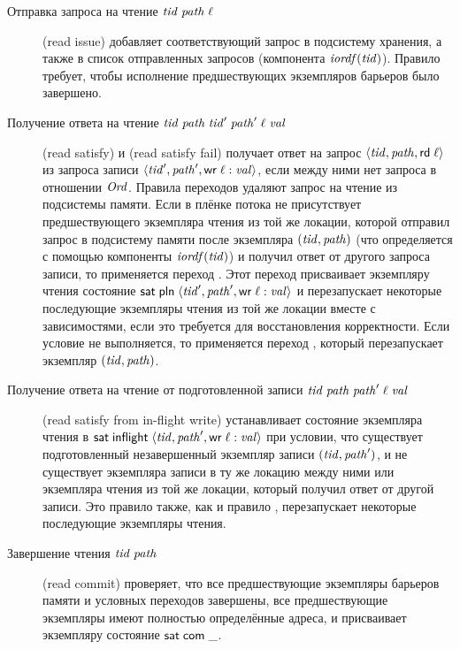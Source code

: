 \begin{description}
\item[Отправка запроса на чтение $\mathit{tid} \; \mathit{path} \; \ell$] (read issue)
  добавляет соответствующий запрос в подсистему хранения, а также в список отправленных
  запросов (компонента $\mathit{iordf}(\mathit{tid})$).
  Правило требует, чтобы исполнение предшествующих экземпляров барьеров было завершено.

\item[Получение ответа на чтение $\mathit{tid} \; \mathit{path} \; \mathit{tid}' \; \mathit{path}' \; \ell \; \mathit{val}$]
  (read satisfy) и 
  (read satisfy fail)
получает ответ на запрос $\langle \mathit{tid}, \mathit{path}, {\sf rd} \; \ell \rangle$ из запроса записи
$\langle \mathit{tid}', \mathit{path}', {\sf wr} \; \ell:\mathit{val} \rangle$, если между ними нет запроса в отношении $\mathit{Ord}$.
Правила переходов удаляют запрос на чтение из подсистемы памяти.
Если в плёнке потока не присутствует предшествующего экземпляра чтения из той же локации,
которой отправил запрос в подсистему памяти после экземпляра $(\mathit{tid}, \mathit{path})$
(что определяется с помощью компоненты $\mathit{iordf}(\mathit{tid})$)
и получил ответ от другого запроса записи, то применяется переход
. Этот переход присваивает экземпляру чтения
состояние $\mathsf{sat} \; \mathsf{pln} \; \langle \mathit{tid}', \mathit{path}', {\sf wr} \; \ell:\mathit{val} \rangle$
и перезапускает некоторые последующие экземпляры чтения из той же локации вместе с зависимостями,
если это требуется для восстановления корректности.
Если условие не выполняется, то применяется переход ,
который перезапускает экземпляр $(\mathit{tid}, \mathit{path})$.

\item[Получение ответа на чтение от подготовленной записи
  $\mathit{tid} \; \mathit{path} \; \mathit{path}' \; \ell \; \mathit{val}$]
  (read satisfy from in-flight write)
устанавливает состояние экземпляра чтения в
$\mathsf{sat} \; \mathsf{inflight} \; \langle \mathit{tid}, \mathit{path}', {\sf wr} \; \ell:\mathit{val} \rangle$
при условии, что существует подготовленный незавершенный экземпляр записи $(\mathit{tid}, \mathit{path}')$,
и не существует экземпляра записи в ту же локацию между ними или экземпляра чтения из той же
локации, который получил ответ от другой записи.
Это правило также, как и правило ,
перезапускает некоторые последующие экземпляры чтения.

\item[Завершение чтения $\mathit{tid} \; \mathit{path}$] (read commit)
  проверяет, что все предшествующие экземпляры барьеров памяти и условных переходов завершены,
  все предшествующие экземпляры имеют полностью определённые адреса, и
  присваивает экземпляру состояние $\mathsf{sat} \; \mathsf{com} \; \_$.
\end{description}

